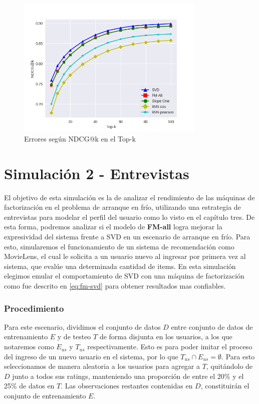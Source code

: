\documentclass[hidelinks,12pt,a4paper]{book}
\theoremstyle{plain}
\theoremstyle{definition}
\begin{document}
\begin{figure}[!ht]
\centering
\includegraphics[width=0.8\textwidth]{graficos/ndcg1.png}
\caption{Errores según NDCG@k en el Top-k}\label{fig:ndcg}
\end{figure}

\section{Simulación 2 - Entrevistas}

El objetivo de esta simulación es la de analizar el rendimiento de las máquinas de factorización en el problema de arranque en frío, utilizando una estrategia de entrevistas para modelar el perfil del usuario como lo visto en el capítulo tres. De esta forma, podremos analizar si el modelo de \textbf{FM-all} logra mejorar la expresividad del sistema frente a SVD en un escenario de arranque en frío. Para esto, simularemos el funcionamiento de un sistema de recomendación como MovieLens, el cual le solicita a un usuario nuevo al ingresar por primera vez al sistema, que evalúe una determinada cantidad de items. En esta simulación elegimos emular el comportamiento de SVD con una máquina de factorización como fue descrito en \eqref{eq:fm-svd} para obtener resultados mas confiables.

\subsubsection{Procedimiento}

Para este escenario, dividimos el conjunto de datos $D$ entre conjunto de datos de entrenamiento $E$ y de testeo $T$ de forma disjunta en los usuarios, a los que notaremos como $E_{us}$ y $T_{us}$ respectivamente. Esto es para poder imitar el proceso del ingreso de un nuevo usuario en el sistema, por lo que $T_{us}\cap E_{us} = \emptyset$. Para esto seleccionamos de manera aleatoria a los usuarios para agregar a $T$, quitándolo de $D$ junto a todos sus ratings, manteniendo una proporción de entre el 20\% y el 25\% de datos en $T$. Las observaciones restantes contenidas en $D$, constituirán el conjunto de entrenamiento $E$.
\end{document}
